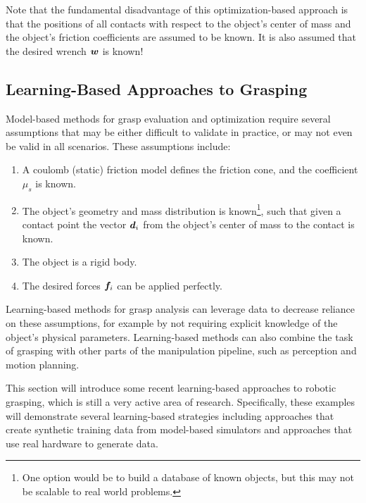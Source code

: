 Note that the fundamental disadvantage of this optimization-based approach is that the positions of all contacts with respect to the object's center of mass and the object's friction coefficients are assumed to be known. It is also assumed that the desired wrench $\bm{w}$ is known!


\subsection{Learning-Based Approaches to Grasping} \label{subsec:grasplearning}
Model-based methods for grasp evaluation and optimization require several assumptions that may be either difficult to validate in practice, or may not even be valid in all scenarios. These assumptions include:
\begin{enumerate}
    \item A coulomb (static) friction model defines the friction cone, and the coefficient $\mu_s$ is known.
    \item The object's geometry and mass distribution is known\footnote{One option would be to build a database of known objects, but this may not be scalable to real world problems.}, such that given a contact point the vector $\bm{d}_i$ from the object's center of mass to the contact is known.
    \item The object is a rigid body.
    \item The desired forces $\bm{f}_i$ can be applied perfectly.
\end{enumerate}
Learning-based methods for grasp analysis\cite{BohgMoralesEtAl2014} can leverage data to decrease reliance on these assumptions, for example by not requiring explicit knowledge of the object's physical parameters. Learning-based methods can also combine the task of grasping with other parts of the manipulation pipeline, such as perception and motion planning. 

This section will introduce some recent learning-based approaches to robotic grasping, which is still a very active area of research. Specifically, these examples will demonstrate several learning-based strategies including approaches that create synthetic training data from model-based simulators and approaches that use real hardware to generate data.

